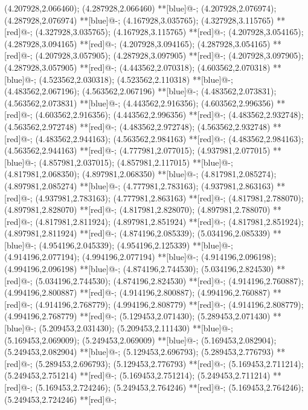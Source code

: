 (4.207928,2.066460); (4.287928,2.066460) **[blue]@{-};
(4.207928,2.076974); (4.287928,2.076974) **[blue]@{-};
(4.167928,3.035765); (4.327928,3.115765) **[red]@{-};
(4.327928,3.035765); (4.167928,3.115765) **[red]@{-};
(4.207928,3.054165); (4.287928,3.094165) **[red]@{-};
(4.207928,3.094165); (4.287928,3.054165) **[red]@{-};
(4.207928,3.057905); (4.287928,3.097905) **[red]@{-};
(4.207928,3.097905); (4.287928,3.057905) **[red]@{-};
(4.443562,2.070318); (4.603562,2.070318) **[blue]@{-};
(4.523562,2.030318); (4.523562,2.110318) **[blue]@{-};
(4.483562,2.067196); (4.563562,2.067196) **[blue]@{-};
(4.483562,2.073831); (4.563562,2.073831) **[blue]@{-};
(4.443562,2.916356); (4.603562,2.996356) **[red]@{-};
(4.603562,2.916356); (4.443562,2.996356) **[red]@{-};
(4.483562,2.932748); (4.563562,2.972748) **[red]@{-};
(4.483562,2.972748); (4.563562,2.932748) **[red]@{-};
(4.483562,2.944163); (4.563562,2.984163) **[red]@{-};
(4.483562,2.984163); (4.563562,2.944163) **[red]@{-};
(4.777981,2.077015); (4.937981,2.077015) **[blue]@{-};
(4.857981,2.037015); (4.857981,2.117015) **[blue]@{-};
(4.817981,2.068350); (4.897981,2.068350) **[blue]@{-};
(4.817981,2.085274); (4.897981,2.085274) **[blue]@{-};
(4.777981,2.783163); (4.937981,2.863163) **[red]@{-};
(4.937981,2.783163); (4.777981,2.863163) **[red]@{-};
(4.817981,2.788070); (4.897981,2.828070) **[red]@{-};
(4.817981,2.828070); (4.897981,2.788070) **[red]@{-};
(4.817981,2.811924); (4.897981,2.851924) **[red]@{-};
(4.817981,2.851924); (4.897981,2.811924) **[red]@{-};
(4.874196,2.085339); (5.034196,2.085339) **[blue]@{-};
(4.954196,2.045339); (4.954196,2.125339) **[blue]@{-};
(4.914196,2.077194); (4.994196,2.077194) **[blue]@{-};
(4.914196,2.096198); (4.994196,2.096198) **[blue]@{-};
(4.874196,2.744530); (5.034196,2.824530) **[red]@{-};
(5.034196,2.744530); (4.874196,2.824530) **[red]@{-};
(4.914196,2.760887); (4.994196,2.800887) **[red]@{-};
(4.914196,2.800887); (4.994196,2.760887) **[red]@{-};
(4.914196,2.768779); (4.994196,2.808779) **[red]@{-};
(4.914196,2.808779); (4.994196,2.768779) **[red]@{-};
(5.129453,2.071430); (5.289453,2.071430) **[blue]@{-};
(5.209453,2.031430); (5.209453,2.111430) **[blue]@{-};
(5.169453,2.069009); (5.249453,2.069009) **[blue]@{-};
(5.169453,2.082904); (5.249453,2.082904) **[blue]@{-};
(5.129453,2.696793); (5.289453,2.776793) **[red]@{-};
(5.289453,2.696793); (5.129453,2.776793) **[red]@{-};
(5.169453,2.711214); (5.249453,2.751214) **[red]@{-};
(5.169453,2.751214); (5.249453,2.711214) **[red]@{-};
(5.169453,2.724246); (5.249453,2.764246) **[red]@{-};
(5.169453,2.764246); (5.249453,2.724246) **[red]@{-};
